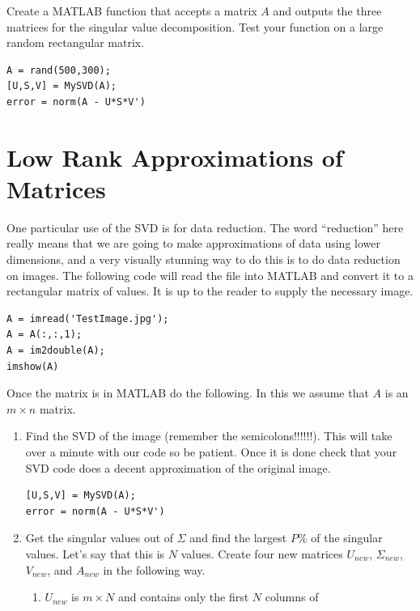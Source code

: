 \begin{problem}
    Create a MATLAB function that accepts a matrix $A$ and outputs the three matrices for
    the singular value decomposition.  Test your function on a large random rectangular
    matrix.
\begin{lstlisting}
A = rand(500,300);
[U,S,V] = MySVD(A);
error = norm(A - U*S*V')
\end{lstlisting}
\end{problem}






\newpage\section{Low Rank Approximations of Matrices}

\begin{problem}
    One particular use of the SVD is for data reduction.  The word ``reduction'' here
    really means that we are going to make approximations of data using lower dimensions,
    and a very visually stunning way to do this is to do data reduction on images.  The following code will read
    the file  into MATLAB and convert it to a rectangular matrix of
    values.  It is up to the reader to supply the necessary image.
\begin{lstlisting}
A = imread('TestImage.jpg');
A = A(:,:,1);
A = im2double(A);
imshow(A)
\end{lstlisting}
    Once the matrix is in MATLAB do the following.  In this we assume that $A$ is an $m
    \times n$ matrix.
    \begin{enumerate}
        \item Find the SVD of the image (remember the semicolons!!!!!!).  This will take
            over a minute with our code so be patient.  Once it is done check that your
            SVD code does a decent approximation of the original image.
\begin{lstlisting}
[U,S,V] = MySVD(A);
error = norm(A - U*S*V')
\end{lstlisting}
        \item Get the singular values out of $\Sigma$ and find the largest $P$\% of the
            singular values. Let's say that this is $N$ values.  Create four new matrices
            $U_{new}$, $\Sigma_{new}$, $V_{new}$, and $A_{new}$ in the following way.
            \begin{enumerate}
                \item $U_{new}$ is $m \times N$ and contains only the first $N$ columns of

\end{enumerate}
\end{enumerate}
\end{problem}
